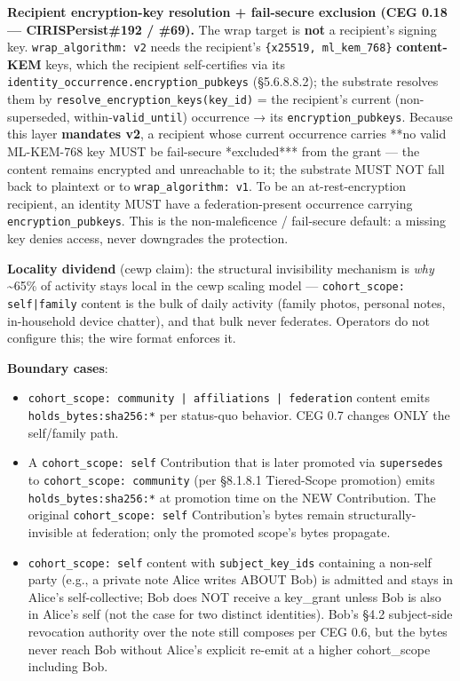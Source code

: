 \documentclass[11pt]{article}
\begin{document}
\textbf{Recipient encryption-key resolution + fail-secure exclusion (CEG 0.18 — CIRISPersist\#192 / \#69).} The wrap target is \textbf{not} a recipient's signing key. \texttt{wrap\_algorithm: v2} needs the recipient's \texttt{\{x25519, ml\_kem\_768\}} \textbf{content-KEM} keys, which the recipient self-certifies via its \texttt{identity\_occurrence.encryption\_pubkeys} (§5.6.8.8.2); the substrate resolves them by \texttt{resolve\_encryption\_keys(key\_id)} = the recipient's current (non-superseded, within-\texttt{valid\_until}) occurrence → its \texttt{encryption\_pubkeys}. Because this layer \textbf{mandates v2}, a recipient whose current occurrence carries **no valid ML-KEM-768 key MUST be fail-secure *excluded*** from the grant — the content remains encrypted and unreachable to it; the substrate MUST NOT fall back to plaintext or to \texttt{wrap\_algorithm: v1}. To be an at-rest-encryption recipient, an identity MUST have a federation-present occurrence carrying \texttt{encryption\_pubkeys}. This is the non-maleficence / fail-secure default: a missing key denies access, never downgrades the protection.


\textbf{Locality dividend} (cewp claim): the structural invisibility mechanism is \textit{why} \textasciitilde{}65\% of activity stays local in the cewp scaling model — \texttt{cohort\_scope: self|family} content is the bulk of daily activity (family photos, personal notes, in-household device chatter), and that bulk never federates. Operators do not configure this; the wire format enforces it.


\textbf{Boundary cases}:


\begin{itemize}\setlength\itemsep{0pt}
\item \texttt{cohort\_scope: community | affiliations | federation} content emits \texttt{holds\_bytes:sha256:*} per status-quo behavior. CEG 0.7 changes ONLY the self/family path.
\item A \texttt{cohort\_scope: self} Contribution that is later promoted via \texttt{supersedes} to \texttt{cohort\_scope: community} (per §8.1.8.1 Tiered-Scope promotion) emits \texttt{holds\_bytes:sha256:*} at promotion time on the NEW Contribution. The original \texttt{cohort\_scope: self} Contribution's bytes remain structurally-invisible at federation; only the promoted scope's bytes propagate.
\item \texttt{cohort\_scope: self} content with \texttt{subject\_key\_ids} containing a non-self party (e.g., a private note Alice writes ABOUT Bob) is admitted and stays in Alice's self-collective; Bob does NOT receive a key\_grant unless Bob is also in Alice's self (not the case for two distinct identities). Bob's §4.2 subject-side revocation authority over the note still composes per CEG 0.6, but the bytes never reach Bob without Alice's explicit re-emit at a higher cohort\_scope including Bob.
\end{itemize}
\end{document}
